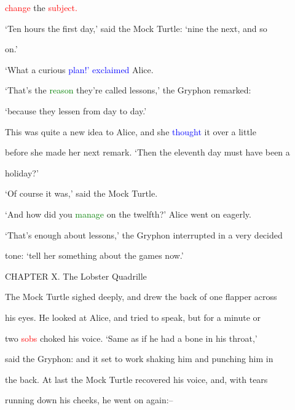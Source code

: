  \textcolor{red}{change} the \textcolor{red}{subject.}



 ‘Ten hours the first day,’ said the Mock Turtle: ‘nine the next, and so

 on.’



 ‘What a curious \textcolor{blue}{plan!’} \textcolor{blue}{exclaimed} Alice.



 ‘That’s the \textcolor{green}{reason} they’re called \textcolor{BurntOrange}{lessons,’} the Gryphon remarked:

 ‘because they \textcolor{BurntOrange}{lessen} from day to day.’



 This was quite a new idea to Alice, and she \textcolor{blue}{thought} it over a little

 before she made her next remark. ‘Then the eleventh day must have been a

 \textcolor{BurntOrange}{holiday?’}



 ‘Of course it was,’ said the Mock Turtle.



 ‘And how did you \textcolor{green}{manage} on the twelfth?’ Alice went on eagerly.



 ‘That’s enough about \textcolor{BurntOrange}{lessons,’} the Gryphon \textcolor{BurntOrange}{interrupted} in a very decided

 tone: ‘tell her something about the games now.’









 CHAPTER X. The Lobster Quadrille



 The Mock Turtle sighed deeply, and drew the back of one flapper across

 his eyes. He looked at Alice, and tried to speak, but for a minute or

 two \textcolor{red}{sobs} choked his voice. ‘Same as if he had a bone in his throat,’

 said the Gryphon: and it set to work shaking him and \textcolor{BurntOrange}{punching} him in

 the back. At last the Mock Turtle recovered his voice, and, with tears

 running down his cheeks, he went on again:--



